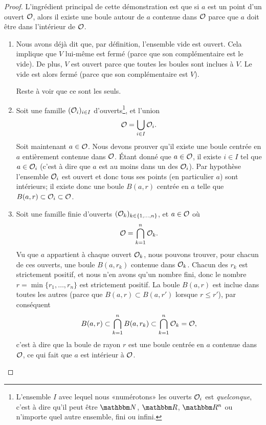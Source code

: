 \begin{proof}
	L'ingrédient principal de cette démonstration est que si $a$ est un point d'un ouvert $\mathcal{O}$, alors il existe une boule autour de $a$ contenue dans $\mathcal{O}$ parce que $a$ doit être dans l'intérieur de $\mathcal{O}$.
	\begin{enumerate}

		\item
			Nous avons déjà dit que, par définition, l'ensemble vide est ouvert. Cela implique que $V$ lui-même est fermé (parce que son complémentaire est le vide). De plus, $V$ est ouvert parce que toutes les boules sont inclues à $V$. Le vide est alors fermé (parce que son complémentaire est $V$).

                        Reste à voir que ce sont les seuls.
		\item
			Soit une famille $(\mathcal{O}_i)_{i\in I}$ d'ouverts\footnote{L'ensemble $I$ avec lequel nous «numérotons» les ouverts $\mathcal{O}_i$ est \emph{quelconque}, c'est à dire qu'il peut être $\eN$, $\eR$, $\eR^n$ ou n'importe quel autre ensemble, fini ou infini.}, et l'union
			\begin{equation}
				\mathcal{O}=\bigcup_{i\in I}\mathcal{O}_i.
			\end{equation}
			Soit maintenant $a\in\mathcal{O}$. Nous devons prouver qu'il existe une boule centrée en $a$ entièrement contenue dans $\mathcal{O}$. Étant donné que $a\in\mathcal{O}$, il existe $i\in I$ tel que $a\in\mathcal{O}_i$ (c'est à dire que $a$ est au moins dans un des $\mathcal{O}_i$). Par hypothèse l'ensemble $\mathcal{O}_i$ est ouvert et donc tous ses points (en particulier $a$) sont intérieurs; il existe donc une boule $B(a,r)$ centrée en $a$ telle que $B(a,r)\subset\mathcal{O}_i\subset\mathcal{O}$.

		\item
			Soit une famille finie d'ouverts $(\mathcal{O}_k)_{k\in\{ 1,\ldots,n \}}$, et $a\in\mathcal{O}$ où
			\begin{equation}
				\mathcal{O}=\bigcap_{k=1}^n\mathcal{O}_k.
			\end{equation}
			Vu que $a$ appartient à chaque ouvert $\mathcal{O}_k$, nous pouvons trouver, pour chacun de ces ouverts, une boule $B(a,r_k)$ contenue dans $\mathcal{O}_k$. Chacun des $r_k$ est strictement positif, et nous n'en avons qu'un nombre fini, donc le nombre $r=\min\{ r_1,\ldots,r_n \}$ est strictement positif. La boule $B(a,r)$ est inclue dans toutes les autres (parce que $B(a,r)\subset B(a,r')$ lorsque $r\leq r'$), par conséquent
			\begin{equation}
				B(a,r)\subset\bigcap_{k=1}^nB(a,r_k)\subset\bigcap_{k=1}^n\mathcal{O}_k=\mathcal{O},
			\end{equation}
			c'est à dire que la boule de rayon $r$ est une boule centrée en $a$ contenue dans $\mathcal{O}$, ce qui fait que $a$ est intérieur à $\mathcal{O}$.
	\end{enumerate}

\end{proof}

